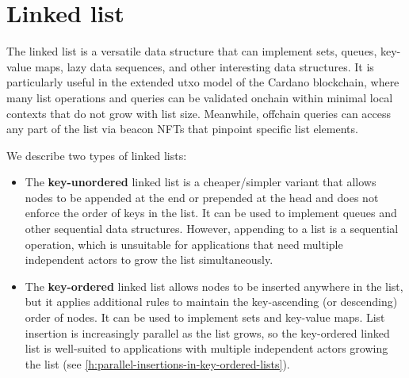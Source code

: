 \documentclass[../midgard.tex]{subfiles}
\begin{document}
\section{Linked list}
\label{h:linked-list}

The linked list is a versatile data structure that can implement sets, queues, key-value maps, lazy data sequences, and other interesting data structures.
It is particularly useful in the extended utxo model of the Cardano blockchain, where many list operations and queries can be validated onchain within minimal local contexts that do not grow with list size.
Meanwhile, offchain queries can access any part of the list via beacon NFTs that pinpoint specific list elements.

We describe two types of linked lists:

\begin{itemize}
    \item The \textbf{key-unordered} linked list is a cheaper/simpler variant that allows nodes to be appended at the end or prepended at the head and does not enforce the order of keys in the list.
      It can be used to implement queues and other sequential data structures.
      However, appending to a list is a sequential operation, which is unsuitable for applications that need multiple independent actors to grow the list simultaneously.
    \item The \textbf{key-ordered} linked list allows nodes to be inserted anywhere in the list, but it applies additional rules to maintain the key-ascending (or descending) order of nodes.
      It can be used to implement sets and key-value maps.
      List insertion is increasingly parallel as the list grows, so the key-ordered linked list is well-suited to applications with multiple independent actors growing the list (see \cref{h:parallel-insertions-in-key-ordered-lists}).
\end{itemize}
\end{document}
